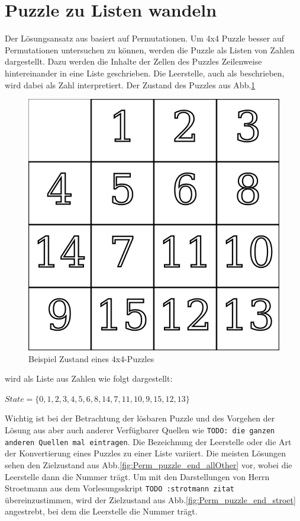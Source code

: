 \section{Puzzle zu Listen wandeln} %
\label{sec:PuzzleToList}
Der Lösungsansatz aus \autocite{Unsolvable-14-15-Numberphile-YT:online} basiert auf Permutationen. Um 4x4 Puzzle besser auf Permutationen untersuchen zu können, werden die Puzzle als Listen von Zahlen dargestellt. Dazu werden die Inhalte der Zellen des Puzzles Zeilenweise hintereinander in eine Liste geschrieben. Die Leerstelle, auch als  beschrieben, wird dabei als Zahl  interpretiert.
Der Zustand des Puzzles aus Abb.\ref{fig:Perm_puzzle_start_Pic}
\begin{figure}[H]
	\centering
	\includegraphics[width=.5\textwidth,keepaspectratio]{img/Start_Puzzle2.png}
	\captionsetup{format=hang}
	\caption{Beispiel Zustand eines 4x4-Puzzles \label{fig:Perm_puzzle_start_Pic}}
\end{figure}
\begin{minipage}{\linewidth}
	wird als Liste aus Zahlen wie folgt dargestellt:
	\begin{center}
		$State = \{0,1,2,3,4,5,6,8,14,7,11,10,9,15,12,13\}$
	\end{center}
\end{minipage}\WNL%
Wichtig ist bei der Betrachtung der lösbaren Puzzle und des Vorgehen der Lösung aus \autocite{Unsolvable-14-15-Numberphile-YT:online} aber auch anderer Verfügbarer Quellen wie \autocite{bibid} \texttt{TODO: die ganzen anderen Quellen mal eintragen}. Die Bezeichnung der Leerstelle oder die Art der Konvertierung eines Puzzles zu einer Liste variiert. Die meisten Lösungen sehen den Zielzustand aus Abb.\ref{fig:Perm_puzzle_end_allOther} vor, wobei die Leerstelle dann die Nummer  trägt. Um mit den Darstellungen von Herrn Stroetmann aus dem Vorlesungsskript \texttt{TODO :strotmann zitat} übereinzustimmen, wird der Zielzustand aus Abb.\ref{fig:Perm_puzzle_end_stroet} angestrebt, bei dem die Leerstelle die Nummer  trägt.\\
